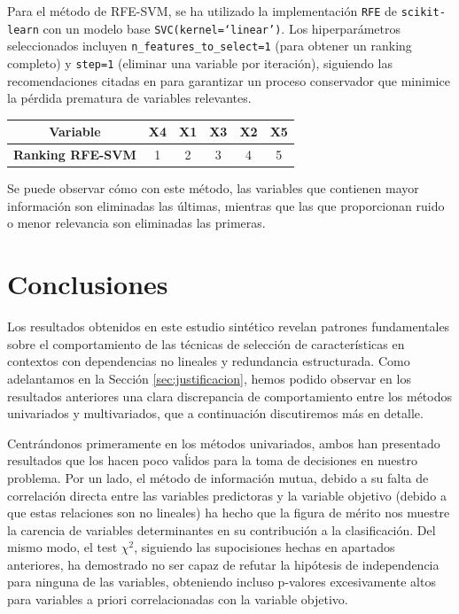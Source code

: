 \documentclass[a4paper,12pt]{article}
\begin{document}
Para el método de RFE-SVM, se ha utilizado la implementación \texttt{RFE} de \texttt{scikit-learn} con un modelo base \texttt{SVC(kernel=`linear')}. Los hiperparámetros seleccionados incluyen \texttt{n\_features\_to\_select=1} (para obtener un ranking completo) y \texttt{step=1} (eliminar una variable por iteración), siguiendo las recomendaciones citadas en \cite{guyon2002} para garantizar un proceso conservador que minimice la pérdida prematura de variables relevantes.

\begin{table}[h]
    \centering
    \begin{tabular}{|c|c|c|c|c|c|}
        \hline
        \textbf{Variable}        & \textbf{X4} & \textbf{X1} & \textbf{X3} & \textbf{X2} & \textbf{X5} \\
        \hline
        \textbf{Ranking RFE-SVM} & 1           & 2           & 3           & 4           & 5           \\
        \hline
    \end{tabular}
    \label{tab:rfe_svm }
\end{table}

Se puede observar cómo con este método, las variables que contienen mayor información son eliminadas las últimas, mientras que las que proporcionan ruido o menor relevancia son eliminadas las primeras.

\newpage
\section{Conclusiones}

Los resultados obtenidos en este estudio sintético revelan patrones fundamentales sobre el comportamiento de las técnicas de selección de características en contextos con dependencias no lineales y redundancia estructurada. Como adelantamos en la Sección \ref{sec:justificacion}, hemos podido observar en los resultados anteriores una clara discrepancia de comportamiento entre los métodos univariados y multivariados, que a continuación discutiremos más en detalle.

Centrándonos primeramente en los métodos univariados, ambos han presentado resultados que los hacen poco vaĺidos para la toma de decisiones en nuestro problema. Por un lado, el método de información mutua, debido a su falta de correlación directa entre las variables predictoras y la variable objetivo (debido a que estas relaciones son no lineales) ha hecho que la figura de mérito nos muestre la carencia de variables determinantes en su contribución a la clasificación. Del mismo modo, el test \(\chi^2\), siguiendo las supocisiones hechas en apartados anteriores, ha demostrado no ser capaz de refutar la hipótesis de independencia para ninguna de las variables, obteniendo incluso p-valores excesivamente altos para variables a priori correlacionadas con la variable objetivo.
\end{document}
